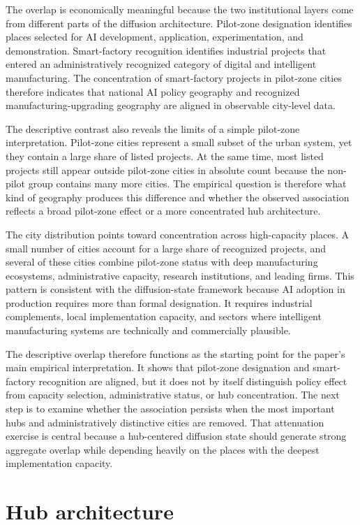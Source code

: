\documentclass[12pt]{article}
\begin{document}
The overlap is economically meaningful because the two institutional layers come from different parts of the diffusion architecture. Pilot-zone designation identifies places selected for AI development, application, experimentation, and demonstration. Smart-factory recognition identifies industrial projects that entered an administratively recognized category of digital and intelligent manufacturing. The concentration of smart-factory projects in pilot-zone cities therefore indicates that national AI policy geography and recognized manufacturing-upgrading geography are aligned in observable city-level data.

The descriptive contrast also reveals the limits of a simple pilot-zone interpretation. Pilot-zone cities represent a small subset of the urban system, yet they contain a large share of listed projects. At the same time, most listed projects still appear outside pilot-zone cities in absolute count because the non-pilot group contains many more cities. The empirical question is therefore what kind of geography produces this difference and whether the observed association reflects a broad pilot-zone effect or a more concentrated hub architecture.

The city distribution points toward concentration across high-capacity places. A small number of cities account for a large share of recognized projects, and several of these cities combine pilot-zone status with deep manufacturing ecosystems, administrative capacity, research institutions, and leading firms. This pattern is consistent with the diffusion-state framework because AI adoption in production requires more than formal designation. It requires industrial complements, local implementation capacity, and sectors where intelligent manufacturing systems are technically and commercially plausible.

The descriptive overlap therefore functions as the starting point for the paper's main empirical interpretation. It shows that pilot-zone designation and smart-factory recognition are aligned, but it does not by itself distinguish policy effect from capacity selection, administrative status, or hub concentration. The next step is to examine whether the association persists when the most important hubs and administratively distinctive cities are removed. That attenuation exercise is central because a hub-centered diffusion state should generate strong aggregate overlap while depending heavily on the places with the deepest implementation capacity.

\section{Hub architecture}
\label{sec:hub}
\end{document}
